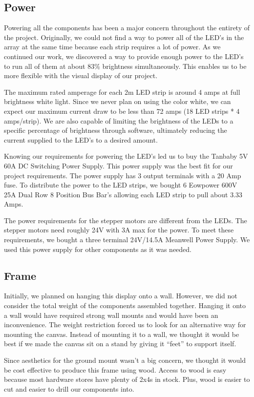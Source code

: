 \documentclass[11pt]{IEEEtran}
\begin{document}
\subsection{Power}
Powering all the components has been a major concern throughout the entirety of the project. Originally, we could not find a way to power all of the LED’s in the array at the same time because each strip requires a lot of power. As we continued our work, we discovered a way to provide enough power to the LED’s to run all of them at about 83\% brightness simultaneously. This enables us to be more flexible with the visual display of our project. 

The maximum rated amperage for each 2m LED strip is around 4 amps at full brightness white light. Since we never plan on using the color white, we can expect our maximum current draw to be less than 72 amps (18 LED strips * 4 amps/strip). We are also capable of limiting the brightness of the LEDs to a specific percentage of brightness through software, ultimately reducing the current supplied to the LED’s to a desired amount.

Knowing our requirements for powering the LED’s led us to buy the Tanbaby 5V 60A DC Switching Power Supply. This power supply was the best fit for our project requirements. The power supply has 3 output terminals with a 20 Amp fuse. To distribute the power to the LED strips, we bought 6 Eowpower 600V 25A Dual Row 8 Position Bus Bar’s allowing each LED strip to pull about 3.33 Amps.

The power requirements for the stepper motors are different from the LEDs. The stepper motors need roughly 24V with 3A max for the power. To meet these requirements, we bought a three terminal 24V/14.5A Meanwell Power Supply. We used this power supply for other components as it was needed.

\subsection{Frame}
Initially, we planned on hanging this display onto a wall. However, we did not consider the total weight of the components assembled together. Hanging it onto a wall would have required strong wall mounts and would have been an inconvenience. The weight restriction forced us to look for an alternative way for mounting the canvas. Instead of mounting it to a wall, we thought it would be best if we made the canvas sit on a stand by giving it “feet” to support itself. 

Since aesthetics for the ground mount wasn’t a big concern, we thought it would be cost effective to produce this frame using wood. Access to wood is easy because most hardware stores have plenty of 2x4s in stock. Plus, wood is easier to cut and easier to drill our components into.
\end{document}
